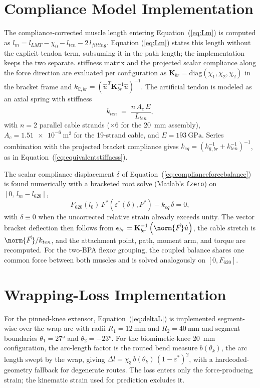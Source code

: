 \section{Compliance Model Implementation}

The compliance-corrected muscle length entering Equation~(\ref{eq:Lm}) is
computed as $l_{m} = l_{LMT} - \chi_{0} - l_{ten} - 2\,l_{fitting}$. Equation
(\ref{eq:Lm}) states this length without the explicit tendon term, subsuming it
in the path length; the implementation keeps the two separate.
stiffness matrix and the projected scalar compliance along the force direction
are evaluated per configuration as
$\mathbf{K}_{br} = \mathrm{diag}(\chi_{1},\chi_{2},\chi_{2})$ in the bracket
frame and $k_{\hat{u},br} = \left(\hat{u}^{\,T}\mathbf{K}_{br}^{-1}\hat{u}\right)^{-1}$.
The artificial tendon is modeled as an axial spring with stiffness
\begin{equation}
    k_{ten} \;=\; \frac{n\,A_{c}\,E}{L_{ten}},
    \label{eq:app_tendon}
\end{equation}
with $n=2$ parallel cable strands ($\times 6$ for the \qty{20}{\mm} assembly),
$A_{c} = \qty{1.51e-6}{\metre\squared}$ for the 19-strand cable, and
$E = \qty{193}{\giga\pascal}$. Series combination with the projected bracket
compliance gives $k_{eq} = \left(k_{\hat{u},br}^{-1} + k_{ten}^{-1}\right)^{-1}$,
as in Equation~(\ref{eq:equivalentstiffness}).

The scalar compliance displacement $\delta$ of
Equation~(\ref{eq:complianceforcebalance}) is found numerically with a
bracketed root solve (Matlab's \texttt{fzero}) on $[0,\, l_{m}-l_{620}]$,
\begin{equation}
    F_{620}(l_{0})\,F^{*}\!\left(\varepsilon^{*}(\delta),P^{*}\right) - k_{eq}\,\delta = 0,
    \label{eq:app_forcebalance}
\end{equation}
with $\delta \equiv 0$ when the uncorrected relative strain already exceeds
unity. The vector bracket deflection then follows from
$\boldsymbol{\epsilon}_{br} = \mathbf{K}_{br}^{-1}\left(\norm{\vec{F}}\hat{u}\right)$,
the cable stretch is $\norm{\vec{F}}/k_{ten}$, and the attachment point, path,
moment arm, and torque are recomputed. For the two-BPA flexor grouping, the
coupled balance shares one common force between both muscles and is solved
analogously on $[0, F_{620}]$.

\section{Wrapping-Loss Implementation}

For the pinned-knee extensor, Equation~(\ref{eq:deltaL}) is implemented
segment-wise over the wrap arc with radii $R_1 = \qty{12}{\mm}$ and
$R_2 = \qty{40}{\mm}$ and segment boundaries $\theta_{1} = \ang{27}$ and
$\theta_{2} = \ang{-23}$. For the biomimetic-knee \qty{20}{\mm} configuration,
the arc-length factor is the routed bend measure $b(\theta_{k})$, the arc length
swept by the wrap, giving
$\Delta l = \chi_{3}\, b(\theta_{k})\,(1-\varepsilon^{*})^{2}$, with a
hardcoded-geometry fallback for degenerate routes. The loss enters only the
force-producing strain; the kinematic strain used for prediction excludes it.
